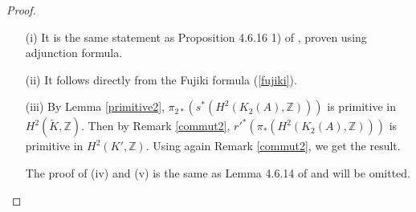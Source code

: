 \documentclass{alggeom}
\newcommand{\Z}{\mathbb{Z}}
\theoremstyle{plain}
\theoremstyle{definition}
\theoremstyle{remark}
\begin{document}
\begin{proof}
\begin{itemize}
\item[(i)]
It is the same statement as Proposition 4.6.16 1) of \cite{Lol}, proven using adjunction formula.
\item[(ii)]
It follows directly from the Fujiki formula (\ref{fujiki}).
\item[(iii)]
By Lemma \ref{primitive2}, $\pi_{2*}(s^*(H^2(K_2(A),\Z)))$ is primitive in $H^{2}(\widetilde{K},\Z)$. Then by Remark \ref{commut2}, $r'^*(\pi_{*}(H^2(K_2(A),\Z)))$ is primitive in $H^{2}(K',\Z)$. Using again Remark \ref{commut2}, we get the result.
\item[]
The proof of (iv) and (v) is the same as Lemma 4.6.14 of \cite{Lol} and will be omitted. 

\end{itemize}
\end{proof}
\end{document}
